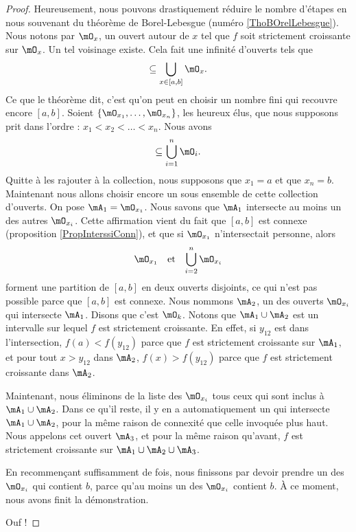 \documentclass{article}
\begin{document}
\begin{proof}
	Heureusement, nous pouvons drastiquement réduire le nombre d'étapes en nous souvenant du théorème de Borel-Lebesgue (numéro \ref{ThoBOrelLebesgue}). Nous notons par $\mO_x$, un ouvert autour de $x$ tel que $f$ soit strictement croissante sur $\mO_x$. Un tel voisinage existe. Cela fait une infinité d'ouverts tels que
	\begin{equation}
		[a,b]\subseteq\bigcup_{x\in[a,b]}\mO_x.
	\end{equation}
	Ce que le théorème dit, c'est qu'on peut en choisir un nombre fini qui recouvre encore $[a,b]$. Soient $\{ \mO_{x_1},\ldots,\mO_{x_n} \}$, les heureux élus, que nous supposons prit dans l'ordre : $x_1<x_2<\ldots<x_n$. Nous avons
	\begin{equation}
		[a,b]\subseteq\bigcup_{i=1}^n\mO_i.
	\end{equation}
	Quitte à les rajouter à la collection, nous supposons que $x_1=a$ et que $x_n=b$. Maintenant nous allons choisir encore un sous ensemble de cette collection d'ouverts. On pose $\mA_1=\mO_{x_1}$. Nous savons que $\mA_1$ intersecte au moins un des autres $\mO_{x_i}$. Cette affirmation vient du fait que $[a,b]$ est connexe (proposition \ref{PropInterssiConn}), et que si $\mO_{x_1}$ n'intersectait personne, alors 
	\begin{equation}
		\begin{aligned}[]
			\mO_{x_1}&&\text{et}&&\bigcup_{i=2}^n\mO_{x_i}
		\end{aligned}
	\end{equation}
	forment une partition de $[a,b]$ en deux ouverts disjoints, ce qui n'est pas possible parce que $[a,b]$ est connexe. Nous nommons $\mA_2$, un des ouverts $\mO_{x_i}$ qui intersecte $\mA_1$. Disons que c'est $\mO_k$. Notons que $\mA_1\cup\mA_2$ est un intervalle sur lequel $f$ est strictement croissante. En effet, si $y_{12}$ est dans l'intersection, $f(a)<f(y_{12})$ parce que $f$ est strictement croissante sur $\mA_1$, et pour tout $x>y_{12}$ dans $\mA_2$, $f(x)>f(y_{12})$ parce que $f$ est strictement croissante dans $\mA_2$. 

	Maintenant, nous éliminons de la liste des $\mO_{x_i}$ tous ceux qui sont inclus à $\mA_1\cup\mA_2$. Dans ce qu'il reste, il y en a automatiquement un qui intersecte $\mA_1\cup\mA_2$, pour la même raison de connexité que celle invoquée plus haut. Nous appelons cet ouvert $\mA_3$, et pour la même raison qu'avant, $f$ est strictement croissante sur $\mA_1\cup\mA_2\cup\mA_3$.

	En recommençant suffisamment de fois, nous finissons par devoir prendre un des $\mO_{x_i}$ qui contient $b$, parce qu'au moins un des $\mO_{x_i}$ contient $b$. À ce moment, nous avons finit la démonstration.

	Ouf !
\end{proof}
\end{document}
